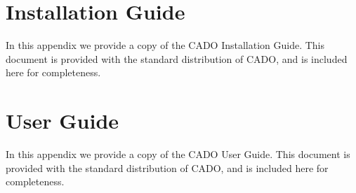 \documentclass[11pt, a4paper, bibtotoc, idxtotoc, headsepline, footsepline, footexclude, DIV13, oneside, final]{scrbook}
\begin{document}
	\frontmatter
	
	
	
	
	
	
	
	
	
	\listoftodos
	\tableofcontents
   	

	\mainmatter
	
				
		
		
		
		
		
		
 
		
		
		
		\appendix 
		
		\chapter{Installation Guide}
		\label{app:installationGuide}
	        In this appendix we provide a copy of the CADO Installation Guide. This document is provided with the standard distribution of CADO, and is included here for completeness.
		
		\chapter{User Guide}
		\label{app:userGuide}
		In this appendix we provide a copy of the CADO User Guide. This document is provided with the standard distribution of CADO, and is included here for completeness.
		
		
\end{document}
